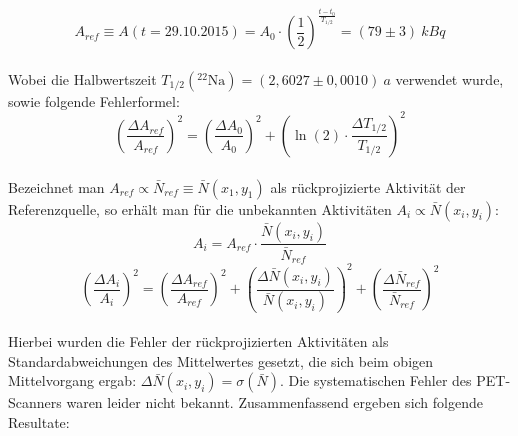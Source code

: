             \begin{equation}
            	A_{ref} \equiv A(t =\textrm{29.10.2015}) = A_0 \cdot \left( \frac{1}{2}\right)^{\frac{t-t_0}{T_{1/2}}} = (79 \pm 3)\ \unit{kBq}
            \end{equation}\\
            Wobei die Halbwertszeit $T_{1/2}(^{22}\textrm{Na}) = (2,6027 \pm 0,0010)\ \unit{a}$ verwendet wurde, sowie folgende Fehlerformel:
            \begin{equation}
                \left(\frac{\Delta A_{ref}}{A_{ref}}\right)^2 = \left(\frac{\Delta A_0}{A_0}\right)^2 + \left(\ln(2) \cdot \frac{\Delta T_{1/2}}{T_{1/2}}\right)^2
            \end{equation}\\   
            Bezeichnet man $A_{ref} \propto \bar{N}_{ref} \equiv \bar{N}(x_1,y_1)$ als rückprojizierte Aktivität der Referenzquelle, so erhält man für die unbekannten Aktivitäten $A_i \propto \bar{N}(x_i,y_i)$:
            \begin{equation}
            	A_i = A_{ref} \cdot \frac{\bar{N}(x_i,y_i)}{\bar{N}_{ref}}
            \end{equation}    
            \begin{equation}
                 \left(\frac{\Delta A_i}{A_i}\right)^2 = \left(\frac{\Delta A_{ref}}{A_{ref}}\right)^2 + \left(\frac{\Delta \bar{N}(x_i,y_i)}{\bar{N}(x_i,y_i)}\right)^2 + \left(\frac{\Delta \bar{N}_{ref}}{\bar{N}_{ref}}\right)^2
             \end{equation}\\   
             Hierbei wurden die Fehler der rückprojizierten Aktivitäten als Standardabweichungen des Mittelwertes gesetzt, die sich beim obigen Mittelvorgang ergab: $\Delta \bar{N}(x_i,y_i) = \sigma(\bar{N})$. Die systematischen Fehler des PET-Scanners waren leider nicht bekannt. Zusammenfassend ergeben sich folgende Resultate:  
            
